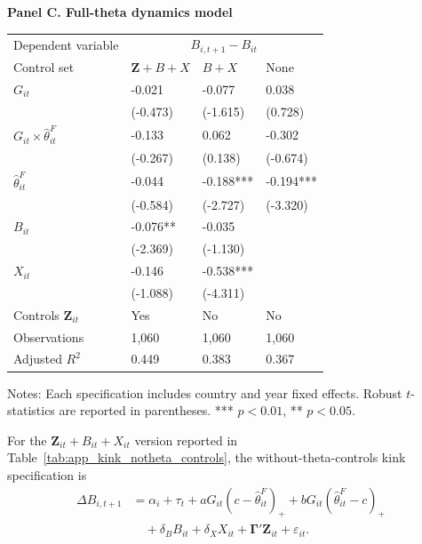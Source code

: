 \begin{table}[H]
\begin{threeparttable}
\vspace{0.35em}
\textbf{Panel C. Full-theta dynamics model}\\[0.45em]
\begin{tabularx}{\textwidth}{lYYY}
\toprule
Dependent variable &  \\
Control set & $\mathbf{Z}+B+X$ & $B+X$ & None \\
\midrule
$G_{it}$ & -0.021 & -0.077 & 0.038 \\
 & (-0.473) & (-1.615) & (0.728) \\
$G_{it}\times\widehat{\theta}^{F}_{it}$ & -0.133 & 0.062 & -0.302 \\
 & (-0.267) & (0.138) & (-0.674) \\
$\widehat{\theta}^{F}_{it}$ & -0.044 & -0.188*** & -0.194*** \\
 & (-0.584) & (-2.727) & (-3.320) \\
$B_{it}$ & -0.076** & -0.035 &  \\
 & (-2.369) & (-1.130) &  \\
$X_{it}$ & -0.146 & -0.538*** &  \\
 & (-1.088) & (-4.311) &  \\
\midrule
Controls $\mathbf{Z}_{it}$ & Yes & No & No \\
Observations & 1,060 & 1,060 & 1,060 \\
Adjusted $R^2$ & 0.449 & 0.383 & 0.367 \\
\bottomrule
\end{tabularx}
\begin{tablenotes}[flushleft]\footnotesize
\item Notes: Each specification includes country and year fixed effects. Robust $t$-statistics are reported in parentheses. *** $p<0.01$, ** $p<0.05$.
\end{tablenotes}
\end{threeparttable}
\end{table}

For the $\mathbf{Z}_{it}+B_{it}+X_{it}$ version reported in Table~\ref{tab:app_kink_notheta_controls}, the without-theta-controls kink specification is
\begin{equation}
\begin{aligned}
\Delta B_{i,t+1}
&=
\alpha_i+\tau_t
+aG_{it}(c-\widehat\theta^F_{it})_+
+bG_{it}(\widehat\theta^F_{it}-c)_+ \\
&\quad
+\delta_B B_{it}
+\delta_X X_{it}
+\boldsymbol{\Gamma}'\mathbf{Z}_{it}
+\varepsilon_{it}.
\end{aligned}
\label{eq:app_kink_notheta_zbx}
\end{equation}

